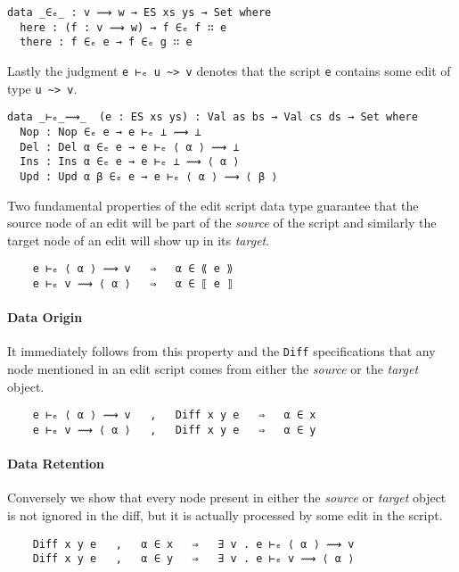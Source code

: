 \documentclass[preprint]{sigplanconf}
\begin{document}
\begin{verbatim}
data _∈ₑ_ : v ⟿ w → ES xs ys → Set where
  here : (f : v ⟿ w) → f ∈ₑ f ∷ e
  there : f ∈ₑ e → f ∈ₑ g ∷ e
\end{verbatim}
    Lastly the judgment \texttt{e ⊢ₑ u \textasciitilde> v} denotes that
    the script \texttt{e} contains some edit of type \texttt{u \textasciitilde> v}.
\begin{verbatim}
data _⊢ₑ_⟿_  (e : ES xs ys) : Val as bs → Val cs ds → Set where
  Nop : Nop ∈ₑ e → e ⊢ₑ ⊥ ⟿ ⊥
  Del : Del α ∈ₑ e → e ⊢ₑ ⟨ α ⟩ ⟿ ⊥
  Ins : Ins α ∈ₑ e → e ⊢ₑ ⊥ ⟿ ⟨ α ⟩
  Upd : Upd α β ∈ₑ e → e ⊢ₑ ⟨ α ⟩ ⟿ ⟨ β ⟩ 
\end{verbatim}
    Two fundamental properties of the edit script data type guarantee that
    the source node of an edit will be part of the \emph{source} of the script and
    similarly the target node of an edit will show up in its \emph{target}.
\begin{verbatim}
    e ⊢ₑ ⟨ α ⟩ ⟿ v   ⇒   α ∈ ⟪ e ⟫
    e ⊢ₑ v ⟿ ⟨ α ⟩   ⇒   α ∈ ⟦ e ⟧
\end{verbatim}

    \paragraph{Data Origin}

    It immediately follows from this property and the \texttt{Diff} specifications 
    that any node mentioned in an edit script comes from either the \emph{source}
    or the \emph{target} object.
\begin{verbatim}
    e ⊢ₑ ⟨ α ⟩ ⟿ v   ,   Diff x y e   ⇒   α ∈ x 
    e ⊢ₑ v ⟿ ⟨ α ⟩   ,   Diff x y e   ⇒   α ∈ y 
\end{verbatim}

    \paragraph{Data Retention}
    Conversely we show that every node present in either the \emph{source} or
    \emph{target} object is not ignored in the diff, but it is 
    actually processed by some edit in the script.

\begin{verbatim}
    Diff x y e   ,   α ∈ x   ⇒   ∃ v . e ⊢ₑ ⟨ α ⟩ ⟿ v
    Diff x y e   ,   α ∈ y   ⇒   ∃ v . e ⊢ₑ v ⟿ ⟨ α ⟩
\end{verbatim}
 
\end{document}

